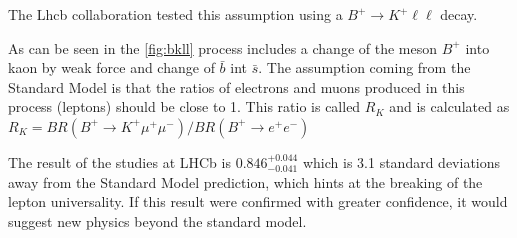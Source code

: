 The Lhcb collaboration tested this assumption using a $B^{+} \rightarrow  K^{+}\ell \ell $ decay.

As can be seen in the \ref{fig:bkll} process includes a change of the meson $B^{+}$ into kaon by weak force and change of $\bar{b}$ int $\bar{s}$.
The assumption coming from the Standard Model is that the ratios of electrons and muons produced in this process (leptons) should be close to 1. This ratio is called $R_{K}$ and is calculated as $R_{K} = BR(B^{+}\rightarrow K^{+}\mu^{+}\mu^{-})/BR(B^{+}\rightarrow e^{+}e^{-})$


The result of the studies at LHCb is $0.846^{+0.044}_{-0.041}$ \cite{lhcbcollaboration2021test} which is 3.1 standard deviations away from the Standard Model prediction, which hints at the breaking of the lepton universality.
If this result were confirmed with greater confidence, it would suggest new physics beyond the standard model.
